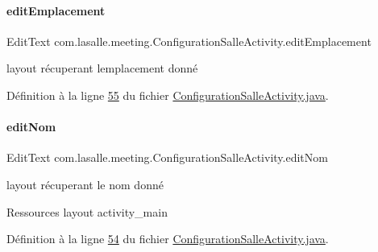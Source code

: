 \paragraph{\texorpdfstring{edit\+Emplacement}{editEmplacement}}
{\footnotesize\ttfamily Edit\+Text com.\+lasalle.\+meeting.\+Configuration\+Salle\+Activity.\+edit\+Emplacement\hspace{0.3cm}{\ttfamily [private]}}



layout récuperant l\textquotesingle{}emplacement donné 



Définition à la ligne \hyperlink{_configuration_salle_activity_8java_source_l00055}{55} du fichier \hyperlink{_configuration_salle_activity_8java_source}{Configuration\+Salle\+Activity.\+java}.

\mbox{\label{classcom_1_1lasalle_1_1meeting_1_1_configuration_salle_activity_a79f6eb0127fb0182880b9f1eefda39c8}} 
\paragraph{\texorpdfstring{edit\+Nom}{editNom}}
{\footnotesize\ttfamily Edit\+Text com.\+lasalle.\+meeting.\+Configuration\+Salle\+Activity.\+edit\+Nom\hspace{0.3cm}{\ttfamily [private]}}



layout récuperant le nom donné 

Ressources layout activity\+\_\+main 

Définition à la ligne \hyperlink{_configuration_salle_activity_8java_source_l00054}{54} du fichier \hyperlink{_configuration_salle_activity_8java_source}{Configuration\+Salle\+Activity.\+java}.

\mbox{\label{classcom_1_1lasalle_1_1meeting_1_1_configuration_salle_activity_a75bd76c0944c831ff00668299d8db929}} 
